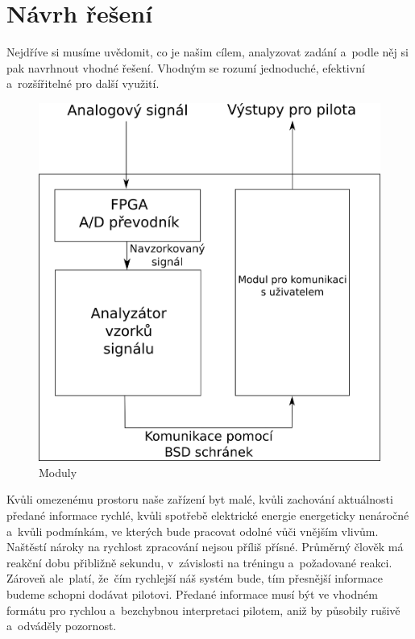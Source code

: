 \chapter{Návrh řešení}\label{navrhReseni}
	Nejdříve si musíme uvědomit, co je našim cílem, analyzovat zadání a~podle něj si pak navrhnout vhodné řešení. Vhodným se rozumí jednoduché, efektivní a~rozšířitelné pro další využití.\par
	
	\begin{figure}[H]
		\begin{center}
			\includegraphics[scale=0.7]{obrazky-figures/navrh_obecne.png}
			\caption{Moduly}
			\label{navrh::moduly}
		\end{center}
	\end{figure}
	
	Kvůli omezenému prostoru naše zařízení byt malé, kvůli zachování aktuálnosti předané informace rychlé, kvůli spotřebě elektrické energie energeticky nenáročné a~kvůli podmínkám, ve kterých bude pracovat odolné vůči vnějším vlivům. Naštěstí nároky na rychlost zpracování nejsou příliš přísné. Průměrný člověk má reakční dobu přibližně sekundu, v~závislosti na tréningu a~požadované reakci. Zároveň ale~platí, že~čím rychlejší náš systém bude, tím přesnější informace budeme schopni dodávat pilotovi. Předané informace musí být ve vhodném formátu pro rychlou a~bezchybnou interpretaci pilotem, aniž by působily rušivě a~odváděly pozornost.
	
